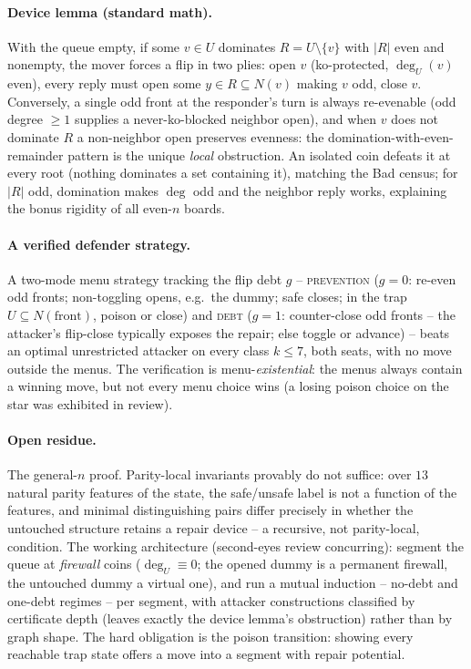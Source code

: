 \documentclass[11pt]{article}
\theoremstyle{plain}
\theoremstyle{definition}
\begin{document}
\paragraph{Device lemma (standard math).} With the queue empty, if some
$v\in U$ dominates $R=U\setminus\{v\}$ with $|R|$ even and nonempty, the
mover forces a flip in two plies: open $v$ (ko-protected, $\deg_U(v)$
even), every reply must open some $y\in R\subseteq N(v)$ making $v$ odd,
close $v$. Conversely, a single odd front at the responder's turn is
always re-evenable (odd degree $\geq1$ supplies a never-ko-blocked
neighbor open), and when $v$ does not dominate $R$ a non-neighbor open
preserves evenness: the domination-with-even-remainder pattern is the
unique \emph{local} obstruction. An isolated coin defeats it at every
root (nothing dominates a set containing it), matching the Bad census;
for $|R|$ odd, domination makes $\deg$ odd and the neighbor reply works,
explaining the bonus rigidity of all even-$n$ boards.

\paragraph{A verified defender strategy.} A two-mode menu strategy
tracking the flip debt $g$ -- \textsc{prevention} ($g=0$: re-even odd
fronts; non-toggling opens, e.g.\ the dummy; safe closes; in the trap
$U\subseteq N(\mathrm{front})$, poison or close) and \textsc{debt} ($g=1$:
counter-close odd fronts -- the attacker's flip-close typically exposes
the repair; else toggle or advance) -- beats an optimal unrestricted
attacker on every class $k\leq7$, both seats, with no move outside the
menus. The verification is menu-\emph{existential}: the menus always
contain a winning move, but not every menu choice wins (a losing poison
choice on the star was exhibited in review).

\paragraph{Open residue.} The general-$n$ proof. Parity-local invariants
provably do not suffice: over $13$ natural parity features of the state,
the safe/unsafe label is not a function of the features, and minimal
distinguishing pairs differ precisely in whether the untouched structure
retains a repair device -- a recursive, not parity-local, condition. The
working architecture (second-eyes review concurring): segment the queue
at \emph{firewall} coins ($\deg_U\equiv 0$; the opened dummy is a
permanent firewall, the untouched dummy a virtual one), and run a mutual
induction -- no-debt and one-debt regimes -- per segment, with attacker
constructions classified by certificate depth (leaves exactly the device
lemma's obstruction) rather than by graph shape. The hard obligation is
the poison transition: showing every reachable trap state offers a move
into a segment with repair potential.
\end{document}
